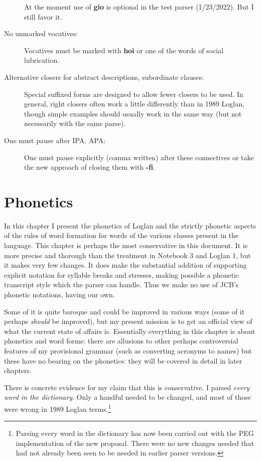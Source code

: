 \documentclass[12pt]{book}
\begin{document}
\begin{description}
At the moment use of {\bf gio} is optional in the test parser (1/23/2022).  But I still favor it.



\item[No unmarked vocatives:]  Vocatives must be marked with {\bf hoi} or one of the words of social lubrication.

\item[Alternative closers for abstract descriptions, subordinate clauses:]  Special suffixed forms are designed to allow fewer closers to be used.  In general, right closers often work a little differently than in 1989 Loglan, though simple examples should usually work in the same way (but not necessarily with the same parse).

\item[One must pause after IPA, APA:]  One must pause explicitly (comma written) after these connectives or take the new approach of closing them with {\bf -fi}.

\end{description}

\chapter{Phonetics}

In this chapter I present the phonetics of Loglan and the strictly phonetic aspects of the rules of word formation for words of the various classes present in the language.  This chapter is perhaps the  most conservative in this document.  It is more precise and thorough than the treatment in Notebook 3 and Loglan 1, but it makes very few changes.  It does make the substantial addition of supporting explicit notation for syllable breaks and stresses, making possible a phonetic transcript style which the parser can handle.  Thus we make no use of JCB's phonetic notations, having our own.

 Some of it is quite baroque and could be improved in various ways (some of it perhaps {\em should\/} be improved), but my present mission is to get an official view of what the current state of affairs is.   Essentially everything in this chapter  is about phonetics and word forms:  there are allusions to other perhaps controversial features of my provisional grammar (such as converting acronyms to names) but these have no bearing on the phonetics:  they will be covered in detail in later chapters.

There is concrete evidence for my claim that this is conservative.  I parsed {\em every word in the dictionary\/}.  Only a handful needed to be changed,
and most of those were wrong in 1989 Loglan terms.\footnote{Parsing every word in the dictionary has now been carried out with the PEG implementation of the new proposal.  There were no new changes needed that had not already been seen to be needed in earlier parser versions.}
\end{document}
